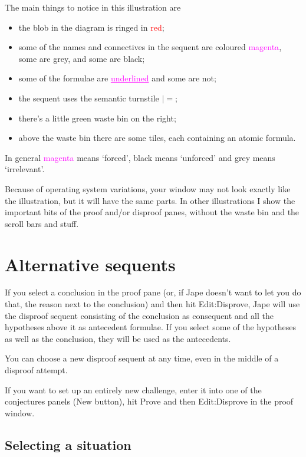 \documentclass[11pt]{book}
\begin{document}
The main things to notice in this illustration are
\begin{itemize}
\item the blob in the diagram is ringed in \textcolor{red}{red};
\item some of the names and connectives in the sequent are coloured \textcolor{magenta}{magenta}, some are \textcolor{halfgrey}{grey}, and some are black;
\item some of the formulae are \textcolor{magenta}{\underline{underlined}} and some are not;
\item the sequent uses the semantic turnstile $|=$; 
\item there's a little green waste bin on the right;
\item above the waste bin there are some tiles, each containing an atomic formula.
\end{itemize}

In general \textcolor{magenta}{magenta} means `forced', black means `unforced' and \textcolor{halfgrey}{grey} means `irrelevant'.

Because of operating system variations, your window may not look exactly like the illustration, but it will have the same parts. In other illustrations I show the important bits of the proof and/or disproof panes, without the waste bin and the scroll bars and stuff.

\section{Alternative sequents}

If you select a conclusion in the proof pane (or, if Jape doesn't want to let you do that, the reason next to the conclusion) and then hit Edit:Disprove, Jape will use the disproof sequent consisting of the conclusion as consequent and all the hypotheses above it as antecedent formulae. If you select some of the hypotheses as well as the conclusion, they will be used as the antecedents.

You can choose a new disproof sequent at any time, even in the middle of a disproof attempt.

If you want to set up an entirely new challenge, enter it into one of the conjectures panels (New button), hit Prove and then Edit:Disprove in the proof window.

\subsection{Selecting a situation}
\end{document}
